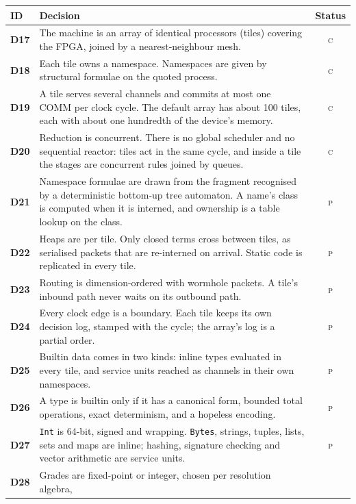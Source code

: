 \documentclass[11pt]{article}
\newcommand{\kw}[1]{\texttt{#1}}
\newcommand{\dec}[1]{\textbf{D#1}}
\newcommand{\conf}{\textsc{c}}
\newcommand{\prop}{\textsc{p}}
\theoremstyle{definition}
\theoremstyle{remark}
\begin{document}
\medskip\noindent
\begin{tabularx}{\textwidth}{@{}l X c@{}}
\toprule
ID & Decision & Status\\
\midrule
\dec{17} & The machine is an array of identical processors (tiles) covering
          the FPGA, joined by a nearest-neighbour mesh. & \conf\\
\dec{18} & Each tile owns a namespace. Namespaces are given by structural
          formulae on the quoted process. & \conf\\
\dec{19} & A tile serves several channels and commits at most one COMM per
          clock cycle. The default array has about 100 tiles, each with about
          one hundredth of the device's memory. & \conf\\
\dec{20} & Reduction is concurrent. There is no global scheduler and no
          sequential reactor: tiles act in the same cycle, and inside a tile
          the stages are concurrent rules joined by queues. & \conf\\
\dec{21} & Namespace formulae are drawn from the fragment recognised by a
          deterministic bottom-up tree automaton. A name's class is computed
          when it is interned, and ownership is a table lookup on the class. & \prop\\
\dec{22} & Heaps are per tile. Only closed terms cross between tiles, as
          serialised packets that are re-interned on arrival. Static code is
          replicated in every tile. & \prop\\
\dec{23} & Routing is dimension-ordered with wormhole packets. A tile's
          inbound path never waits on its outbound path. & \prop\\
\dec{24} & Every clock edge is a boundary. Each tile keeps its own decision
          log, stamped with the cycle; the array's log is a partial order. & \prop\\
\dec{25} & Builtin data comes in two kinds: inline types evaluated in every
          tile, and service units reached as channels in their own
          namespaces. & \prop\\
\dec{26} & A type is builtin only if it has a canonical form, bounded total
          operations, exact determinism, and a hopeless encoding. & \prop\\
\dec{27} & \kw{Int} is 64-bit, signed and wrapping. \kw{Bytes}, strings,
          tuples, lists, sets and maps are inline; hashing, signature
          checking and vector arithmetic are service units. & \prop\\
\dec{28} & Grades are fixed-point or integer, chosen per resolution algebra,

\end{tabularx}
\end{document}
